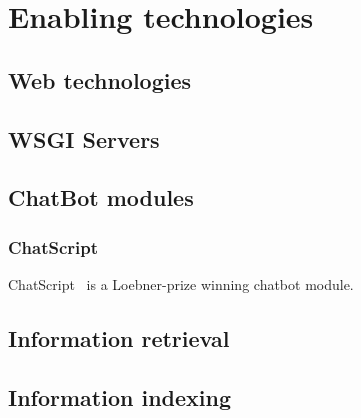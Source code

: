 \chapter{Enabling technologies}
\label{chap:enabling}

\section{Web technologies}

\section{WSGI Servers}

\section{ChatBot modules}

\subsection{ChatScript}
\label{subsec:chatscript}

ChatScript~\cite{wilcox2013} is a Loebner-prize winning chatbot module.

\section{Information retrieval}

\section{Information indexing}
